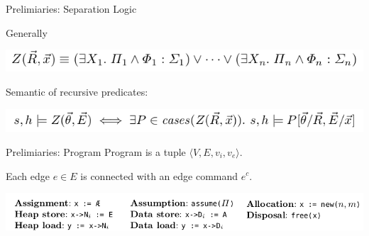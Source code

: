 \documentclass[aspectratio=1610, 13pt]{beamer}
\begin{document}
\begin{frame}{Prelimiaries: Separation Logic}

Generally
\begin{center}
\includegraphics[scale=0.4]{13.png}\end{center}
Semantic of recursive predicates:
\begin{center}
\includegraphics[scale=0.4]{15.png}
\end{center}
\end{frame}

\begin{frame}{Prelimiaries: Program}
Program is a tuple $\langle V, E, v_i, v_e\rangle$.

Each edge  $e\in E$ is connected with an edge command $e^c$.




\begin{center}
\includegraphics[scale=0.4]{16.png}
\end{center}
\end{frame}
\end{document}
